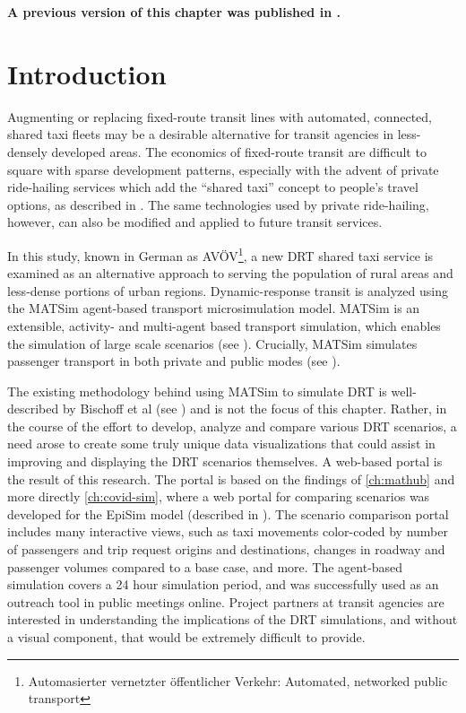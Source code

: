 \textbf{A previous version of this chapter was published in \citet{CharltonLeichKaddoura2021avoev}.}

\vspace{5mm}

\section{Introduction}
\label{avov-introduction}

Augmenting or replacing fixed-route transit lines with automated, connected, shared taxi fleets may be a desirable alternative for transit agencies in less-densely developed areas. The economics of fixed-route transit are difficult to square with sparse development patterns, especially with the advent of private ride-hailing services which add the ``shared taxi'' concept to people's travel options, as described in \cite{Hough2018}. The same technologies used by private ride-hailing, however, can also be modified and applied to future transit services.

In this study, known in German as AVÖV\footnote{Automasierter vernetzter öffentlicher Verkehr: Automated, networked public transport}, a new \gls{DRT} shared taxi service is examined as an alternative approach to serving the population of rural areas and less-dense portions of urban regions. Dynamic-response transit is analyzed using the \gls{MATSim} agent-based transport microsimulation model. MATSim is an extensible, activity- and multi-agent based transport simulation, which enables the simulation of large scale scenarios (see \cite{MATSimBook}). Crucially, MATSim simulates passenger transport in both private and public modes (see \cite{ZiemkeEtAl2019OpenBerlinScenario}).

The existing methodology behind using MATSim to simulate DRT is well-described by Bischoff et al (see \cite{BischoffMaciejewskiNagel2017SharedTaxiIITSC}) and is not the focus of this chapter. Rather, in the course of the effort to develop, analyze and compare various DRT scenarios, a need arose to create some truly unique data visualizations that could assist in improving and displaying the DRT scenarios themselves. A web-based portal is the result of this research. The portal is based on the findings of \autoref{ch:mathub} and more directly \autoref{ch:covid-sim}, where a web portal for comparing scenarios was developed for the EpiSim model (described in \cite{MuellerEtAl2021episim}). The scenario comparison portal includes many interactive views, such as taxi movements color-coded by number of passengers and trip request origins and destinations, changes in roadway and passenger volumes compared to a base case, and more. The agent-based simulation covers a 24 hour simulation period, and was successfully used as an outreach tool in public meetings online. Project partners at transit agencies are interested in understanding the implications of the DRT simulations, and without a visual component, that would be extremely difficult to provide.


